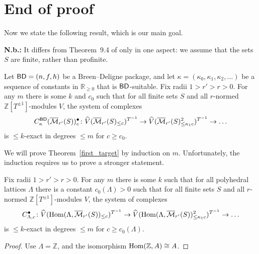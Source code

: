 \section{End of proof}

Now we state the following result, which is our main goal.

\textbf{N.b.:}
It differs from Theorem~9.4 of \cite{Analytic} only in one aspect:
we assume that the sets $S$ are finite, rather than profinite.

\begin{theorem}
  \label{first_target}
  \leanok
  Let $\mathsf{BD} = (n,f,h)$ be a Breen--Deligne package,
  and let $\kappa = (\kappa_0, \kappa_1, \kappa_2, \dots)$ be a sequence of constants in $\mathbb R_{\ge 0}$
  that is $\mathsf{BD}$-suitable.
	Fix radii $1>r'>r>0$.
  For any $m$ there is some $k$ and $c_0$ such that for all finite sets $S$ and all $r$-normed $\mathbb Z[T^{\pm 1}]$-modules $V$,
  the system of complexes
  \[
    C^{\mathsf{BD}}_{\kappa}(\overline{\mathcal M}_{r'}(S))_c^\bullet \colon
    \widehat{V}(\overline{\mathcal M}_{r'}(S)_{\leq c})^{T^{-1}} \to
    \widehat{V}(\overline{\mathcal M}_{r'}(S)_{\leq \kappa_1c}^2)^{T^{-1}}
    \to \ldots
  \]
  is $\leq k$-exact in degrees $\leq m$ for $c\geq c_0$.
\end{theorem}

We will prove Theorem~\ref{first_target} by induction on $m$.
Unfortunately, the induction requires us to prove a stronger statement.

\begin{theorem}
  \label{explicit}
  \leanok
  Fix radii $1>r'>r>0$. For any $m$ there is some $k$
  such that for all polyhedral lattices $\Lambda$
  there is a constant $c_0(\Lambda)>0$
  such that for all finite sets $S$
  and all $r$-normed $\mathbb Z[T^{\pm 1}]$-modules $V$,
  the system of complexes
  \[
  C_{\Lambda,c}^\bullet \colon
  \widehat{V}(\operatorname{Hom}(\Lambda,\overline{\mathcal M}_{r'}(S))_{\leq c})^{T^{-1}} \to
  \widehat{V}(\operatorname{Hom}(\Lambda,\overline{\mathcal M}_{r'}(S))_{\leq \kappa_1c}^2)^{T^{-1}} \to \ldots
  \]
  is $\leq k$-exact in degrees $\leq m$ for $c\geq c_0(\Lambda)$.
\end{theorem}

\begin{proof}
  \leanok
  Use $\Lambda = \mathbb Z$, and the isomorphism $\operatorname{Hom}(\mathbb Z, A) \cong A$.
\end{proof}

